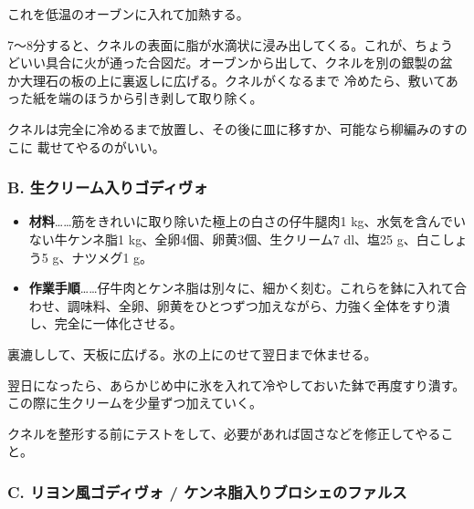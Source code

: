 \begin{recette}
これを低温のオーブンに入れて加熱する。

7〜8分すると、クネルの表面に脂が水滴状に浸み出してくる。これが、ちょう
どいい具合に火が通った合図だ。オーブンから出して、クネルを別の銀製の盆
か大理石の板の上に裏返しに広げる。クネルがくなるまで
冷めたら、敷いてあった紙を端のほうから引き剥して取り除く。

クネルは完全に冷めるまで放置し、その後に皿に移すか、可能なら柳編みのすのこに
載せてやるのがいい。

\maeaki

\hypertarget{godiveau-a-la-creme}{%
\subsubsection{B. 生クリーム入りゴディヴォ}\label{godiveau-a-la-creme}}



\begin{itemize}
\item
  \textbf{材料}\ldots{}\ldots{}筋をきれいに取り除いた極上の白さの仔牛腿肉1
  kg、水気を含んでいない牛ケンネ脂1 kg、全卵4個、卵黄3個、生クリーム7
  dl、塩25 g、白こしょう5 g、ナツメグ1 g。
\item
  \textbf{作業手順}\ldots{}\ldots{}仔牛肉とケンネ脂は別々に、細かく刻む。これらを鉢に入れて合わせ、調味料、全卵、卵黄をひとつずつ加えながら、力強く全体をすり潰し、完全に一体化させる。
\end{itemize}

裏漉しして、天板に広げる。氷の上にのせて翌日まで休ませる。

翌日になったら、あらかじめ中に氷を入れて冷やしておいた鉢で再度すり潰す。この際に生クリームを少量ずつ加えていく。

クネルを整形する前にテストをして、必要があれば固さなどを修正してやること。

\maeaki

\hypertarget{godiveau-lyonnais}{%
\subsubsection{C. リヨン風ゴディヴォ /
ケンネ脂入りブロシェのファルス}\label{godiveau-lyonnais}}


\end{recette}
